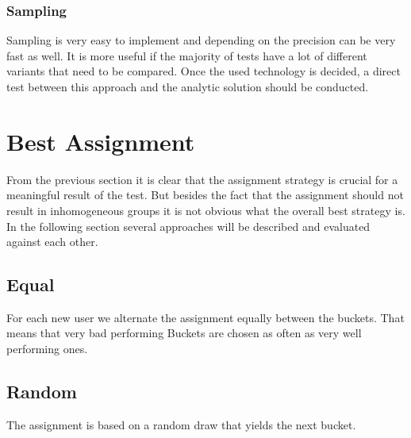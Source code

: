 \documentclass[../Thesis.tex]{subfiles}
\begin{document}
\subsubsection{Sampling}
Sampling is very easy to implement and depending on the precision can be very fast as well. It is more useful if the majority of tests have a lot of different variants that need to be compared. Once the used technology is decided, a direct test between this approach and the analytic solution should be conducted.

\section{Best Assignment}
From the previous section it is clear that the assignment strategy is crucial for a meaningful result of the test. But besides the fact that the assignment should not result in inhomogeneous groups it is not obvious what the overall best strategy is. In the following section several approaches will be described and evaluated against each other.

\subsection{Equal}
For each new user we alternate the assignment equally between the buckets. That means that very bad performing Buckets are chosen as often as very well performing ones.

\subsection{Random}
The assignment is based on a random draw that yields the next bucket.
\end{document}
